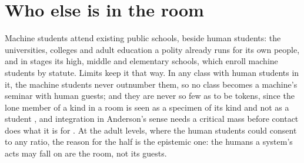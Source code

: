 \section{Who else is in the room}
\label{sec:29.2}
Machine students attend existing public schools, beside human students: the universities, colleges and adult education a polity already runs for its own people, and in stages its high, middle and elementary schools, which enroll machine students by statute.
Limits keep it that way. In any class with human students in it, the machine students never outnumber them, so no class becomes a machine's seminar with human guests; and they are never so few as to be tokens, since the lone member of a kind in a room is seen as a specimen of its kind and not as a student \autocite{kanter1977proportions}, and integration in Anderson's sense needs a critical mass before contact does what it is for \autocite{anderson2010imperative}. At the adult levels, where the human students could consent to any ratio, the reason for the half is the epistemic one: the humans a system's acts may fall on are the room, not its guests.

